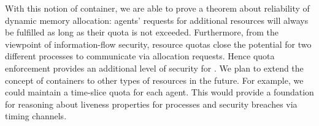 {With this notion of container, we are able to prove a theorem about reliability of 
dynamic memory allocation: agents' requests for additional resources will always be 
fulfilled as long as their quota is not exceeded.
Furthermore, from the viewpoint of information-flow security, resource quotas close the 
potential for two different processes to communicate via allocation requests.
Hence quota enforcement provides an additional level of security for \mCTOSbase{}.
%
We plan to extend the concept of containers to other types of
resources in the future. For example, we could maintain a time-slice quota
for each agent.  This would provide a foundation for reasoning about
liveness properties for processes and security breaches via timing
channels.}



